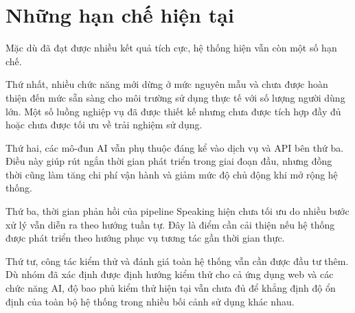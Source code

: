\begin{table}[H]
\centering
\caption{So sánh lợi thế của hệ thống so với các nền tảng hiện có}
\renewcommand{\arraystretch}{1.4}
\small
{}
\end{table}

\section{Những hạn chế hiện tại}
Mặc dù đã đạt được nhiều kết quả tích cực, hệ thống hiện vẫn còn một số hạn chế.

Thứ nhất, nhiều chức năng mới dừng ở mức nguyên mẫu và chưa được hoàn thiện đến mức sẵn sàng cho môi trường sử dụng thực tế với số lượng người dùng lớn. Một số luồng nghiệp vụ đã được thiết kế nhưng chưa được tích hợp đầy đủ hoặc chưa được tối ưu về trải nghiệm sử dụng.

Thứ hai, các mô-đun AI vẫn phụ thuộc đáng kể vào dịch vụ và API bên thứ ba. Điều này giúp rút ngắn thời gian phát triển trong giai đoạn đầu, nhưng đồng thời cũng làm tăng chi phí vận hành và giảm mức độ chủ động khi mở rộng hệ thống.

Thứ ba, thời gian phản hồi của pipeline Speaking hiện chưa tối ưu do nhiều bước xử lý vẫn diễn ra theo hướng tuần tự. Đây là điểm cần cải thiện nếu hệ thống được phát triển theo hướng phục vụ tương tác gần thời gian thực.

Thứ tư, công tác kiểm thử và đánh giá toàn hệ thống vẫn cần được đầu tư thêm. Dù nhóm đã xác định được định hướng kiểm thử cho cả ứng dụng web và các chức năng AI, độ bao phủ kiểm thử hiện tại vẫn chưa đủ để khẳng định độ ổn định của toàn bộ hệ thống trong nhiều bối cảnh sử dụng khác nhau.


